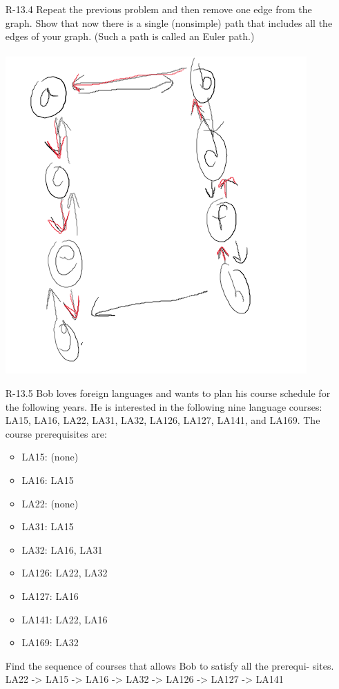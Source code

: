 \begin{itemize}
      \item[R-13.4]  Repeat the previous problem and then remove one edge from the graph.
            Show that now there is a single (nonsimple) path that includes all the edges
            of your graph. (Such a path is called an Euler path.)\\
            \answer\\
            \includegraphics[scale=0.5]{img/R-13_4.png}

      \item [R-13.5]  Bob loves foreign languages and wants to plan his course schedule for the
            following years. He is interested in the following nine language courses:
            LA15, LA16, LA22, LA31, LA32, LA126, LA127, LA141, and LA169.
            The course prerequisites are:
            \begin{itemize}
                  \item LA15: (none)
                  \item LA16: LA15
                  \item LA22: (none)
                  \item LA31: LA15
                  \item LA32: LA16, LA31
                  \item LA126: LA22, LA32
                  \item LA127: LA16
                  \item LA141: LA22, LA16
                  \item LA169: LA32
            \end{itemize}
            Find the sequence of courses that allows Bob to satisfy all the prerequi-
            sites. \\
            \answer
            LA22 -> LA15 -> LA16 -> LA32 -> LA126 -> LA127 -> LA141


\end{itemize}
